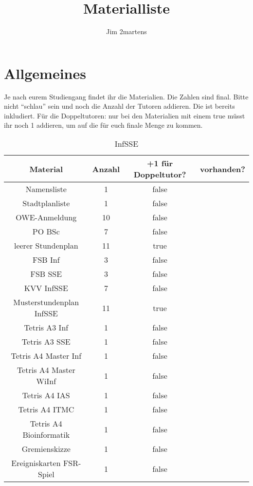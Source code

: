 \documentclass[10pt,a4paper,oneside,ngerman,numbers=noenddot]{scrartcl}
\begin{document}
\author{Jim 2martens}
\title{Materialliste}
\maketitle

\section{Allgemeines}

Je nach eurem Studiengang findet ihr die Materialien. Die Zahlen 
sind final. Bitte nicht "`schlau"' sein und noch die Anzahl der 
Tutoren addieren. Die ist bereits inkludiert. Für die 
Doppeltutoren: nur bei den Materialien mit einem true müsst
ihr noch 1 addieren, um auf die für euch finale Menge zu
kommen.

\begin{table}[ht]
	\caption{InfSSE}
	\begin{tabular}{c|c|c|c}
		\textbf{Material} & \textbf{Anzahl} & \textbf{+1 für Doppeltutor?} & \textbf{vorhanden?} \\
		\hline
		Namensliste & 1 & false & \\
		\hline
		Stadtplanliste & 1 & false & \\
		\hline
		OWE-Anmeldung & 10 & false & \\
		\hline
		PO BSc & 7 & false & \\
		\hline
		leerer Stundenplan & 11 & true & \\
		\hline
		FSB Inf & 3 & false & \\
		\hline
		FSB SSE & 3 & false & \\
		\hline
		KVV InfSSE & 7 & false & \\
		\hline
		Musterstundenplan InfSSE & 11 & true & \\
		\hline
		Tetris A3 Inf & 1 & false & \\
		\hline
		Tetris A3 SSE & 1 & false & \\
		\hline
		Tetris A4 Master Inf & 1 & false & \\
		\hline
		Tetris A4 Master WiInf & 1 & false & \\
		\hline
		Tetris A4 IAS & 1 & false & \\
		\hline
		Tetris A4 ITMC & 1 & false & \\
		\hline
		Tetris A4 Bioinformatik & 1 & false & \\
		\hline
		Gremienskizze & 1 & false & \\
		\hline
		Ereigniskarten FSR-Spiel & 1 & false & \\

\end{tabular}
\end{table}
\end{document}
